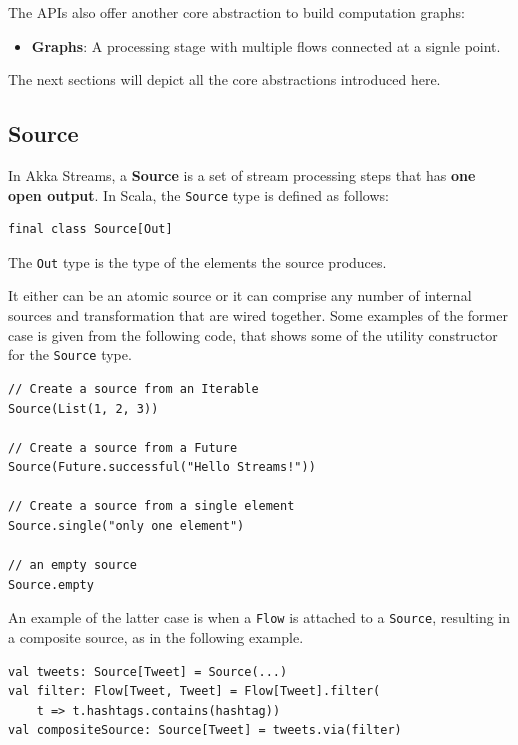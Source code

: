 The APIs also offer another core abstraction to build computation
graphs: 

\begin{itemize}
\itemsep1pt\parskip0pt
\item
  \textbf{Graphs}: A processing stage with multiple flows
connected at a signle point.
\end{itemize}

The next sections will depict all the core abstractions introduced here.


\subsection{Source}\label{source}

In Akka Streams, a \textbf{Source} is a set of stream processing steps
that has \textbf{one open output}. In Scala, the \texttt{Source} type is
defined as follows:

\begin{verbatim}
final class Source[Out]
\end{verbatim}

The \texttt{Out} type is the type of the elements the source produces.

It either can be an atomic source or it can comprise any number of
internal sources and transformation that are wired together. Some
examples of the former case is given from the following code, that shows
some of the utility constructor for the \texttt{Source} type.

\begin{verbatim}
// Create a source from an Iterable
Source(List(1, 2, 3))

// Create a source from a Future
Source(Future.successful("Hello Streams!"))

// Create a source from a single element
Source.single("only one element")

// an empty source
Source.empty
\end{verbatim}

An example of the latter case is when a \texttt{Flow} is attached to a
\texttt{Source}, resulting in a composite source, as in the following
example.

\begin{verbatim}
val tweets: Source[Tweet] = Source(...)
val filter: Flow[Tweet, Tweet] = Flow[Tweet].filter(
	t => t.hashtags.contains(hashtag))
val compositeSource: Source[Tweet] = tweets.via(filter)
\end{verbatim}

